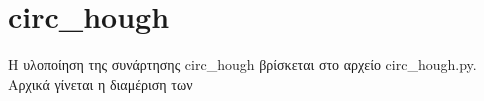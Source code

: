 \documentclass{article}
\begin{document}
%
%
%
%
%

\section{circ\_hough}\label{hough}
Η υλοποίηση της συνάρτησης circ\_hough βρίσκεται στο αρχείο circ\_hough.py.
Αρχικά γίνεται η διαμέριση των 
\end{document}
